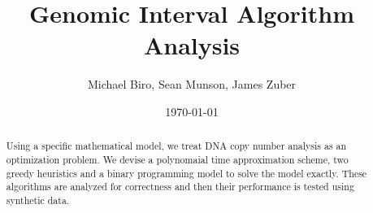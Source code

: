 \documentclass[11pt,twocolumn]{article}
\title{Genomic Interval Algorithm Analysis}
\author{Michael Biro, Sean Munson, James Zuber}
\date{\today}
\begin{document}
\maketitle

\begin{abstract} 
Using a specific mathematical model, we treat DNA copy number analysis as an optimization problem.  We devise a polynomaial time approximation scheme, two greedy heuristics and a binary programming model to solve the model exactly. These algorithms are analyzed for correctness and then their performance is tested using synthetic data.
\end{abstract}




{}
\end{document}
